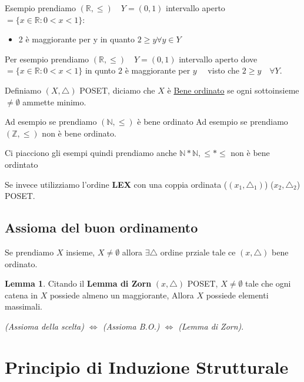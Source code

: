 \documentclass{article}
\theoremstyle{definition}
\newtheorem{lemma}{Lemma}[section]
\begin{document}
Esempio prendiamo $(\mathbb{R}, \le) \quad Y = (0,1)$ intervallo aperto $= \{x \in \mathbb{R} : 0 < x < 1\}$:
\begin{itemize}
        \item 2 è maggiorante per y in quanto $2 \ge y \forall y \in Y$
\end{itemize}

Per esempio prendiamo $(\mathbb{R}, \le) \quad Y = (0,1)$ intervallo aperto dove $ = \{x \in \mathbb{R} : 0 < x < 1\}$ in qunto $2$ è maggiorante per $y \quad $ visto che $2 \ge y \quad  \forall Y$.


Definiamo $(X, \triangle)$ POSET, diciamo che $X$ è \underline{Bene ordinato} se ogni sottoinsieme  $\not = \emptyset$ ammette minimo. \par
Ad esempio se prendiamo $(\mathbb{N}, \le)$ è bene ordinato
Ad esempio se prendiamo $(\mathbb{Z}, \le)$ non è bene ordinato. \par
Ci piacciono gli esempi quindi prendiamo anche $\mathbb{N}*\mathbb{N}, \le * \le  $ non è bene ordintato \par
Se invece utilizziamo l'ordine \textbf{LEX} con una coppia ordinata ($(x_1,\triangle_1)$) ($x_2,\triangle_2$) POSET.\newline


\subsection{Assioma del buon ordinamento}\label{Assioma_del_buon_ordinamento}
Se prendiamo $X$ insieme, $X \not = \emptyset$ allora $\exists \triangle$ ordine prziale tale ce $(x,\triangle)$ bene ordinato. \par

\begin{lemma}
Citando il \textbf{Lemma di Zorn} $(x, \triangle)$ POSET, $X \not = \emptyset$ tale che ogni catena in $X$ possiede almeno un maggiorante, Allora $X$ possiede elementi massimali. \par
\textit{(Assioma della scelta) $\Leftrightarrow$ (Assioma B.O.)  $\Leftrightarrow$ (Lemma di Zorn)}. \par
\end{lemma}





\newpage
\section{Principio di Induzione Strutturale}
\end{document}
